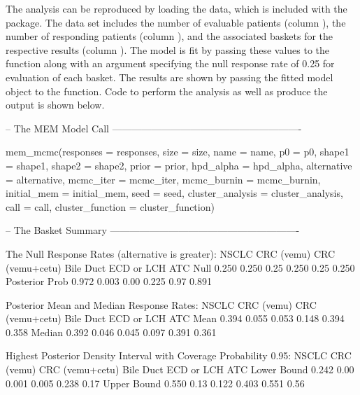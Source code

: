 The analysis can be reproduced by loading the  data, which is included with the package. The data set includes the number of evaluable patients (column ), the number of responding patients (column ), and the associated baskets for the respective results (column ). The model is fit by passing these values to the  function along with an argument specifying the null response rate of 0.25 for evaluation of each basket. The results are shown by passing the fitted model object to the  function. Code to perform the analysis as well as produce the output is shown below.


\begin{Schunk}
	\begin{Soutput}

    -- The MEM Model Call ----------------------------------------------------------
    
    mem_mcmc(responses = responses, size = size, name = name, p0 = p0, 
        shape1 = shape1, shape2 = shape2, prior = prior, hpd_alpha = hpd_alpha, 
        alternative = alternative, mcmc_iter = mcmc_iter, mcmc_burnin = mcmc_burnin, 
        initial_mem = initial_mem, seed = seed, cluster_analysis = cluster_analysis, 
        call = call, cluster_function = cluster_function)
    
    -- The Basket Summary ----------------------------------------------------------
    
    The Null Response Rates (alternative is greater):
                   NSCLC CRC (vemu) CRC (vemu+cetu) Bile Duct ECD or LCH   ATC
    Null           0.250      0.250            0.25     0.250       0.25 0.250
    Posterior Prob 0.972      0.003            0.00     0.225       0.97 0.891
    
    Posterior Mean and Median Response Rates:
           NSCLC CRC (vemu) CRC (vemu+cetu) Bile Duct ECD or LCH   ATC
    Mean   0.394      0.055           0.053     0.148      0.394 0.358
    Median 0.392      0.046           0.045     0.097      0.391 0.361
    
    Highest Posterior Density Interval with Coverage Probability 0.95:
                NSCLC CRC (vemu) CRC (vemu+cetu) Bile Duct ECD or LCH  ATC
    Lower Bound 0.242       0.00           0.001     0.005      0.238 0.17
    Upper Bound 0.550       0.13           0.122     0.403      0.551 0.56
    

\end{Soutput}
\end{Schunk}
